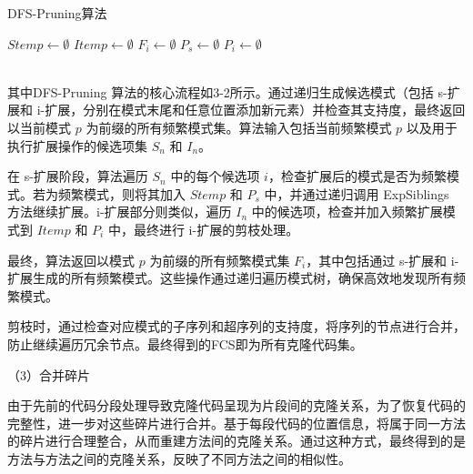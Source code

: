 \begin{algorithm}[htbp]
\caption{DFS-Pruning算法}

$Stemp \gets \emptyset$ 
$Itemp \gets \emptyset$ 
$F_i \gets \emptyset$ 
$P_s \gets \emptyset$ 
$P_i \gets \emptyset$ \\
 \\
\end{algorithm}
    

其中DFS-Pruning 算法的核心流程如3-2所示。通过递归生成候选模式（包括 s-扩展和 i-扩展，分别在模式末尾和任意位置添加新元素）并检查其支持度，最终返回以当前模式 $p$ 为前缀的所有频繁模式集。算法输入包括当前频繁模式 $p$ 以及用于执行扩展操作的候选项集 $S_n$ 和 $I_n$。

在 s-扩展阶段，算法遍历 $S_n$ 中的每个候选项 $i$，检查扩展后的模式是否为频繁模式。若为频繁模式，则将其加入 $Stemp$ 和 $P_s$ 中，并通过递归调用 ExpSiblings 方法继续扩展。i-扩展部分则类似，遍历 $I_n$ 中的候选项，检查并加入频繁扩展模式到 $Itemp$ 和 $P_i$ 中，最终进行 i-扩展的剪枝处理。

最终，算法返回以模式 $p$ 为前缀的所有频繁模式集 $F_i$，其中包括通过 s-扩展和 i-扩展生成的所有频繁模式。这些操作通过递归遍历模式树，确保高效地发现所有频繁模式。


剪枝时，通过检查对应模式的子序列和超序列的支持度，将序列的节点进行合并，防止继续遍历冗余节点。最终得到的FCS即为所有克隆代码集。

（3）合并碎片

由于先前的代码分段处理导致克隆代码呈现为片段间的克隆关系，为了恢复代码的完整性，进一步对这些碎片进行合并。基于每段代码的位置信息，将属于同一方法的碎片进行合理整合，从而重建方法间的克隆关系。通过这种方式，最终得到的是方法与方法之间的克隆关系，反映了不同方法之间的相似性。


